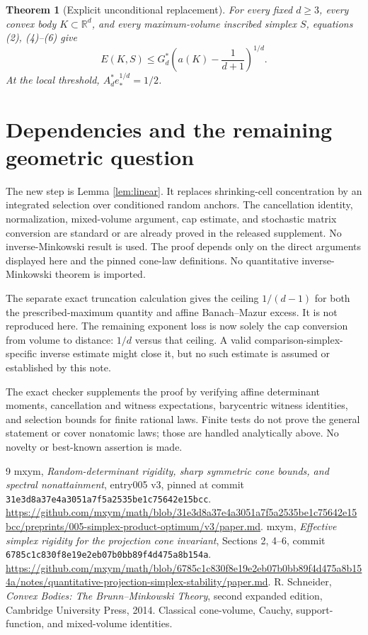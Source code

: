 \documentclass[11pt]{article}
\newtheorem{theorem}{Theorem}
\begin{document}
\begin{theorem}[Explicit unconditional replacement]
For every fixed $d\ge3$, every convex body $K\subset\mathbb R^d$, and every
maximum-volume inscribed simplex $S$, equations (2), (4)--(6) give
\[
 E(K,S)\le G_d^*\left(a(K)-\frac1{d+1}\right)^{1/d}.
\]
At the local threshold, $A_d^*e_*^{1/d}=1/2$.
\end{theorem}

\section{Dependencies and the remaining geometric question}

The new step is Lemma \ref{lem:linear}. It replaces shrinking-cell
concentration by an integrated selection over conditioned random anchors.
The cancellation identity, normalization, mixed-volume argument, cap
estimate, and stochastic matrix conversion are standard or are already
proved in the released supplement. No inverse-Minkowski result is used.
The proof depends only on the direct arguments displayed here and the pinned
cone-law definitions. No quantitative inverse-Minkowski theorem is imported.

The separate exact truncation calculation gives the ceiling $1/(d-1)$
for both the prescribed-maximum quantity and affine Banach--Mazur excess.
It is not reproduced here. The remaining exponent loss is now solely the
cap conversion from volume to distance: $1/d$ versus that ceiling.
A valid comparison-simplex-specific inverse estimate might close it, but
no such estimate is assumed or established by this note.

The exact checker supplements the proof by verifying affine determinant
moments, cancellation and witness expectations, barycentric witness
identities, and selection bounds for finite rational laws. Finite tests
do not prove the general statement or cover nonatomic laws; those are
handled analytically above. No novelty or best-known assertion is made.

\begin{thebibliography}{9}\small
{}
mxym, \emph{Random-determinant rigidity, sharp symmetric cone bounds, and
spectral nonattainment}, entry005 v3, pinned at commit
\nolinkurl{31e3d8a37e4a3051a7f5a2535be1c75642e15bcc}.
\url{https://github.com/mxym/math/blob/31e3d8a37e4a3051a7f5a2535be1c75642e15bcc/preprints/005-simplex-product-optimum/v3/paper.md}.
mxym, \emph{Effective simplex rigidity for the projection cone invariant},
Sections 2, 4--6, commit
\nolinkurl{6785c1c830f8e19e2eb07b0bb89f4d475a8b154a}.
\url{https://github.com/mxym/math/blob/6785c1c830f8e19e2eb07b0bb89f4d475a8b154a/notes/quantitative-projection-simplex-stability/paper.md}.
R. Schneider, \emph{Convex Bodies: The Brunn--Minkowski Theory}, second
expanded edition, Cambridge University Press, 2014. Classical cone-volume,
Cauchy, support-function, and mixed-volume identities.
\end{thebibliography}
\end{document}
